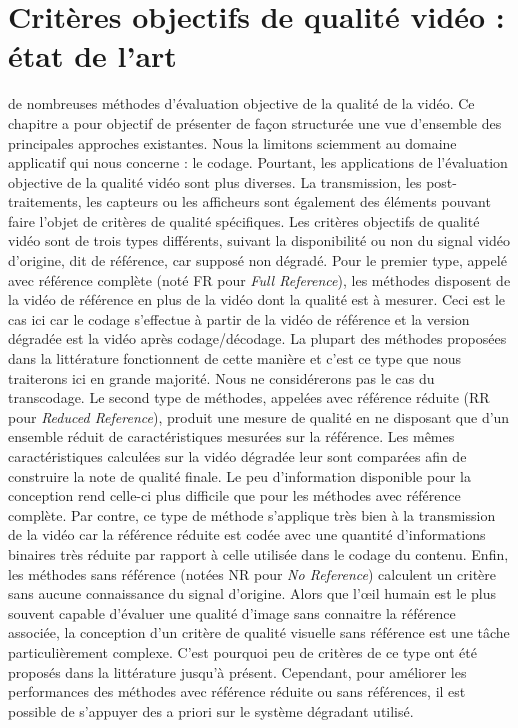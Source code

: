 \chapter{Critères objectifs de qualité vidéo : état de l'art} \label{chap:criteres}
 de nombreuses méthodes d'évaluation objective de la qualité de la vidéo. Ce chapitre a pour objectif de présenter de façon structurée une vue d'ensemble des principales approches existantes. Nous la limitons sciemment au domaine applicatif qui nous concerne : le codage. Pourtant, les applications de l'évaluation objective de la qualité vidéo sont plus diverses. La transmission, les post-traitements, les capteurs ou les afficheurs sont également des éléments pouvant faire l'objet de critères de qualité spécifiques. Les critères objectifs de qualité vidéo sont de trois types différents, suivant la disponibilité ou non du signal vidéo d'origine, dit de référence, car supposé non dégradé. Pour le premier type, appelé avec référence complète (noté FR pour \emph{Full Reference}), les méthodes disposent de la vidéo de référence en plus de la vidéo dont la qualité est à mesurer. Ceci est le cas ici car le codage s'effectue à partir de la vidéo de référence et la version dégradée est la vidéo après codage/décodage. La plupart des méthodes proposées dans la littérature fonctionnent de cette manière et c'est ce type que nous traiterons ici en grande majorité. Nous ne considérerons pas le cas du transcodage. Le second type de méthodes, appelées avec référence réduite (RR pour \emph{Reduced Reference}), produit une mesure de qualité en ne disposant que d'un ensemble réduit de caractéristiques mesurées sur la référence. Les mêmes caractéristiques calculées sur la vidéo dégradée leur sont comparées afin de construire la note de qualité finale. Le peu d'information disponible pour la conception rend celle-ci plus difficile que pour les méthodes avec référence complète. Par contre, ce type de méthode s'applique très bien à la transmission de la vidéo car la référence réduite est codée avec une quantité d'informations binaires très réduite par rapport à celle utilisée dans le codage du contenu. Enfin, les méthodes sans référence (notées NR pour \emph{No Reference}) calculent un critère sans aucune connaissance du signal d'origine. Alors que l'\oe il humain est le plus souvent capable d'évaluer une qualité d'image sans connaitre la référence associée, la conception d'un critère de qualité visuelle sans référence est une tâche particulièrement complexe. C'est pourquoi peu de critères de ce type ont été proposés dans la littérature jusqu'à présent. Cependant, pour améliorer les performances des méthodes avec référence réduite ou sans références, il est possible de s'appuyer des a priori sur le système dégradant utilisé.

